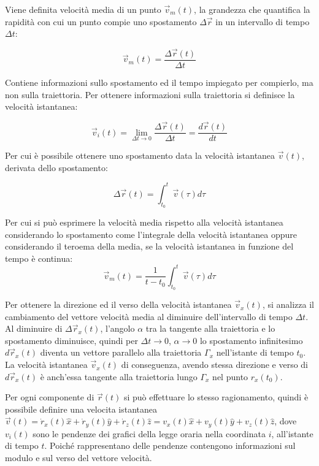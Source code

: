 \documentclass{article}
\numberwithin{equation}{subsection}
\begin{document}
Viene definita velocità media di un punto $\vec{v}_m(t)$, la grandezza che quantifica la rapidità con cui un punto compie uno spostamento $\Delta \vec{r}$ 
in un intervallo di tempo $\Delta t$: 

\begin{equation}
    \vec{v}_m(t) = \displaystyle\frac{\Delta\vec{r}(t)}{\Delta t}
\end{equation}

Contiene informazioni sullo spostamento ed il 
tempo impiegato per compierlo, ma non sulla traiettoria.
Per ottenere informazioni sulla traiettoria si definisce la velocità istantanea:

\begin{equation}
    \vec{v}_i(t) = \lim_{\Delta t \to 0} \displaystyle\frac{\Delta\vec{r}(t)}{\Delta t} = \displaystyle\frac{d\vec{r}(t)}{dt}
\end{equation}

Per cui è possibile ottenere uno spostamento data la velocità istantanea $\vec{v}(t)$, derivata dello spostamento:

\begin{equation}
    \Delta\vec{r}(t)=\displaystyle\int_{t_0}^{t}\vec v(\tau)d\tau
\end{equation}

Per cui si può esprimere la velocità media rispetto alla velocità istantanea considerando lo spostamento come l'integrale della velocità istantanea 
oppure considerando il teroema della media, se la velocità istantanea in funzione del tempo è continua:
\begin{equation*}
    \vec{v}_m(t)=\displaystyle\frac{1}{t-t_0}\int_{t_0}^{t}\vec v(\tau)d\tau
\end{equation*}


Per ottenere la direzione ed il verso della velocità istantanea $\vec{v}_x(t)$, si analizza il cambiamento del vettore velocità media al diminuire 
dell'intervallo di tempo $\Delta t$. Al diminuire di $\Delta\vec{r}_x(t)$, l'angolo $\alpha$ tra la tangente alla 
traiettoria e lo spostamento diminuisce, quindi per $\Delta t \to 0$, $\alpha \to 0$ 
lo spostamento infinitesimo $d\vec{r}_x(t)$ diventa un 
vettore parallelo alla traiettoria $\Gamma_x$ nell'istante di 
tempo $t_0$. La velocità istantanea $\vec{v}_x(t)$ di conseguenza, avendo 
stessa direzione e verso di $d\vec{r}_x(t)$ è anch'essa tangente alla traiettoria 
lungo $\Gamma_x$ nel punto $r_x(t_0)$.

Per ogni componente di $\vec{r}(t)$ 
si può effettuare lo stesso ragionamento, 
quindi è possibile definire una velocita istantanea 
$\vec{v}(t) =\dot{r}_x(t)\hat{x} +\dot{r}_y(t)\hat{y} +\dot{r}_z(t)\hat{z} = v_x(t)\hat{x} + v_y(t)\hat{y} + v_z(t)\hat{z}$, dove ${v}_i(t)$ 
sono le pendenze dei grafici della legge oraria nella coordinata $i$, all'istante 
di tempo $t$. Poiché rappresentano delle pendenze contengono informazioni sul modulo e sul verso del vettore velocità. 
\end{document}
